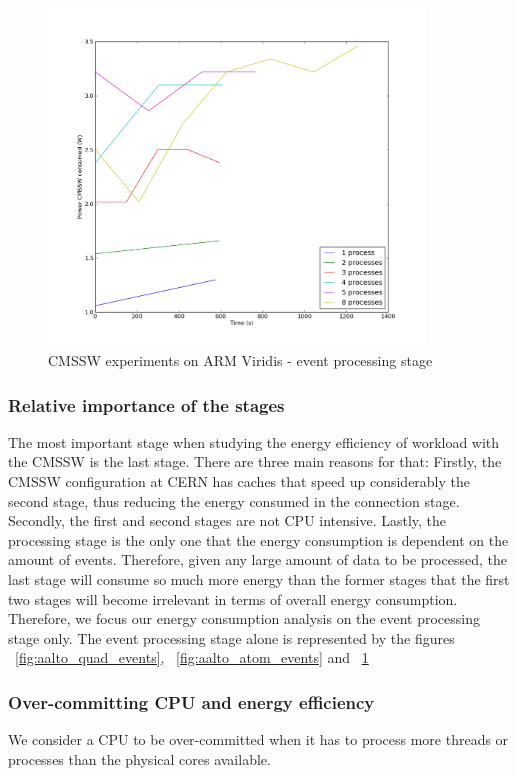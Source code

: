 \begin{figure}[h]
  \centering
    \includegraphics[width=100mm]{"img/aalto/aalto_armEvents"}
    \caption{CMSSW experiments on ARM Viridis - event processing stage}
    \label{fig:aalto_arm_events}
\end{figure}

\subsubsection*{Relative importance of the stages}
The most important stage when studying the energy efficiency of
workload with the CMSSW is the last stage. There are three main reasons for that: Firstly, the CMSSW configuration at CERN has caches that speed up considerably the second stage, thus reducing the energy consumed in the connection stage.
Secondly, the first and second stages are not CPU intensive.
Lastly, the processing stage is the only one that the energy consumption is dependent on the amount of events. Therefore, given any large amount of
data to be processed, the last stage will consume so much more energy than the former stages that the first two stages will become irrelevant in terms of overall energy consumption. Therefore, we focus our energy consumption analysis on the event processing stage only. The event processing stage alone is represented by the figures ~\ref{fig:aalto_quad_events}, ~\ref{fig:aalto_atom_events} and ~\ref{fig:aalto_arm_events}


\subsubsection*{Over-committing CPU and energy efficiency}
We consider a CPU to be over-committed when it has to process more threads or processes than the physical cores available.

